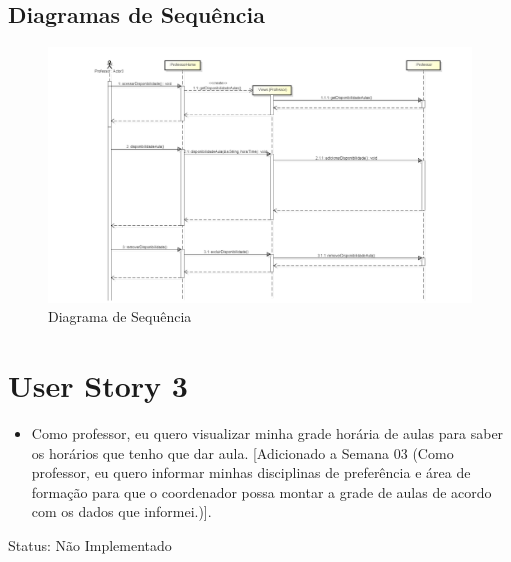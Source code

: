 \documentclass{abnt}
\begin{document}
		\begin{landscape}
		\subsection{Diagramas de Sequência}
						\begin{figure}[h]
							\begin{center}
							\includegraphics[width=500px]{SequenceDisponibilidade}
							\caption{Diagrama de Sequência}
							\label{fig:SequenceDisponibilidade}
							\end{center}				
						\end{figure}
						\FloatBarrier
		\end{landscape}
			
	\clearpage
	\section{User Story 3}

		\begin{itemize}
			\item Como professor, eu quero visualizar minha grade horária de aulas para saber os horários que tenho que dar aula.
			[Adicionado a Semana 03 (Como professor, eu quero informar minhas disciplinas de preferência e área de formação para que o coordenador 
			possa montar a grade de aulas de acordo com os dados que informei.)].
		\end{itemize}
		
		Status: Não Implementado
		
\end{document}
